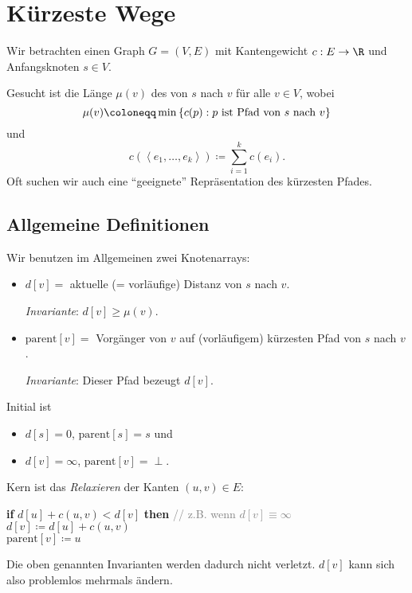 \chapter{Kürzeste Wege}

Wir betrachten einen Graph \( G = (V,E) \) mit Kantengewicht \( c: E \to \R \) und Anfangsknoten \( s \in V \).

Gesucht ist die Länge \( \mu(v) \) des  von \( s \) nach \( v \) für alle \( v \in V \), wobei
\begin{equation*}
  \mu(v) \coloneqq \min\left \{ c(p) : p \text{ ist Pfad von \( s \) nach \( v \)} \right \}
\end{equation*}
und
\begin{equation*}
  c\left( \left\langle e_1,\dots,e_k \right\rangle \right) \coloneqq \sum_{i=1}^k c(e_i) \text{.}
\end{equation*}
Oft suchen wir auch eine ``geeignete'' Repräsentation des kürzesten Pfades.

\section{Allgemeine Definitionen}

Wir benutzen im Allgemeinen zwei Knotenarrays:
\begin{itemize}
  \item \( d[v] = \) aktuelle (= vorläufige) Distanz von \( s \) nach \( v \).

  \emph{Invariante}: \( d[v] \geq \mu(v) \).

  \item \( \text{parent}[v] = \) Vorgänger von \( v \) auf (vorläufigem) kürzesten Pfad von \( s \) nach \( v \).

  \emph{Invariante}: Dieser Pfad bezeugt \( d[v] \).
\end{itemize}
Initial ist
\begin{itemize}
  \item \( d[s] = 0 \), \( \text{parent}[s] = s \) und
  \item \( d[v] = \infty \), \( \text{parent}[v] = \perp \).
\end{itemize}
Kern ist das \emph{Relaxieren} der Kanten \( (u,v) \in E \):
\begin{pseudocode}
  \textbf{if} \( d[u] + c(u,v) < d[v] \) \textbf{then} \enskip \textcolor{gray}{// z.B. wenn \( d[v] \equiv \infty \)} \\
  \phantom{\enskip} \( d[v] \coloneqq d[u] + c(u,v) \) \\
  \phantom{\enskip} \( \text{parent}[v] \coloneqq u \)
\end{pseudocode}
Die oben genannten Invarianten werden dadurch nicht verletzt. \( d[v] \) kann sich also problemlos mehrmals ändern.

